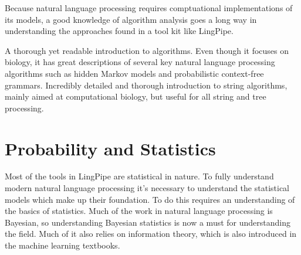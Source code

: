\noindent
Because natural language processing requires comptuational
implementations of its models, a good knowledge of algorithm analysis
goes a long way in understanding the approaches found in a tool kit
like LingPipe.

\begin{itemize}
%
{A thorough yet readable introduction to algorithms.}
%
{Even though it focuses on biology, it has great
descriptions of several key natural language processing algorithms
such as hidden Markov models and probabilistic context-free grammars.}
%
{Incredibly detailed and thorough introduction to
string algorithms, mainly aimed at computational biology, but
useful for all string and tree processing.}
%
\end{itemize}






\section{Probability and Statistics}

\noindent
Most of the tools in LingPipe are statistical in nature.  To fully
understand modern natural language processing it's necessary to
understand the statistical models which make up their foundation.
To do this requires an understanding of the basics of statistics.
Much of the work in natural language processing is Bayesian, so
understanding Bayesian statistics is now a must for understanding
the field.  Much of it also relies on information theory, which is
also introduced in the machine learning textbooks.

